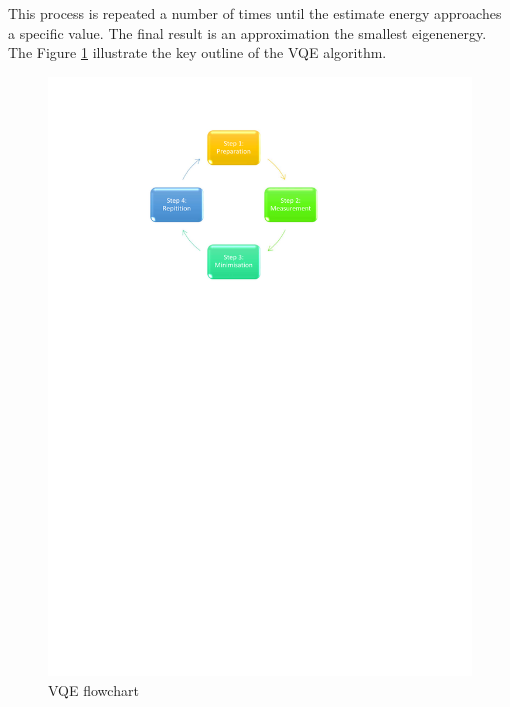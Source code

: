 \documentclass[12pt]{article}
\begin{document}
This process is repeated a number of times until the estimate energy approaches a specific value. The final result is an approximation the smallest eigenenergy. The Figure \ref{VQE} illustrate the key outline of the VQE algorithm.
\begin{figure}[H]
\begin{center}
\includegraphics[scale=1]{VQEdiagram.pdf}
\end{center}
\caption{VQE flowchart}\label{VQE}
\end{figure}
\end{document}

